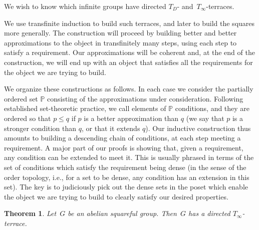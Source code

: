 \documentclass[12pt,a4paper]{article}
\newtheorem{thm}{Theorem}[section]
\renewcommand{\P}{\mathbb{P}}
\begin{document}
We wish to know which infinite groups have directed $T_D$- and~$T_{\infty}$-terraces.  

We use transfinite induction to build such terraces, and later to build the squares more generally. 
The construction will proceed by building better and better approximations to the object in transfinitely many steps, using each step to satisfy a requirement. Our approximations will be coherent and, at the end of the construction, we will end up with an object that satisfies all the requirements for the object we are trying to build.


We organize these constructions as follows. In each case we consider the partially ordered set $\P$ consisting of the approximations under consideration. Following established set-theoretic practice, we call elements of $\P$ conditions, and they are ordered so that $p\leq q$ if $p$ is a better approximation than $q$ (we say that $p$ is a stronger condition than $q$, or that it extends $q$).  Our inductive construction thus amounts to building a descending chain of conditions, at each step meeting a requirement. A major part of our proofs is showing that, given a requirement, any condition can be extended to meet it. This is usually phrased in terms of the set of conditions which satisfy the requirement being dense (in the sense of the order topology, i.e., for a set to be dense, any condition has an extension in this set). The key is to judiciously pick out the dense sets in the poset which enable the object we are trying to build to clearly satisfy our desired properties.

\begin{thm}\label{th:T_infty}
Let~$G$ be an abelian squareful group. Then~$G$ has a directed $T_{\infty}$-terrace.
\end{thm}
\end{document}
